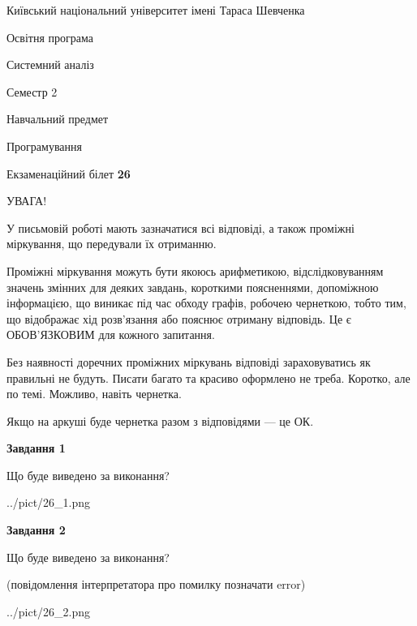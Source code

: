 \documentclass[12pt, ukrainian]{article}
\begin{document}
{{\begin {small}\par
{ \center  Київський національний університет імені Тараса Шевченка \par}
{\parbox {5 cm}{Освітня програма \hfill}{\parbox {7 cm}{Системний аналіз \hfill}}\parbox {6 cm}{\hfill Семестр 2}}\par
{\parbox {5 cm} {Навчальний предмет \hfill}\parbox {7 cm}{Програмування \hfill}\parbox {6cm}{\hfill}\par}\vspace{-7pt} \end{small}}{\center Екзаменаційний білет \No \textbf
{ 26 }\par}}
{
\begin {large}
УВАГА!

У письмовій роботі мають зазначатися всі відповіді, а також проміжні міркування, що передували їх отриманню.

Проміжні міркування можуть бути якоюсь арифметикою, відслідковуванням зна\-чень змінних для деяких завдань,
короткими поясненнями, допоміжною інформацією, що виникає під час обходу графів, робочею чернеткою,
тобто тим, що відображає хід розв’язання або пояснює отриману відповідь.
Це є ОБОВ’ЯЗКОВИМ для кожного запитання.

Без наявності доречних проміжних міркувань відповіді зараховуватись як правиль\-ні не будуть.
Писати багато та красиво оформлено не треба. Коротко, але по темі. Можли\-во, навіть чернетка.

Якщо на аркуші буде чернетка разом з відповідями --- це ОК.

\newpage

{\begin {center}\textbf{Завдання 1}\end {center}}\par
Що буде виведено за виконання?\par
\begin{center}
	{../pict/26_1.png}
\end{center}
\newpage

{\begin {center}\textbf{Завдання 2}\end {center}}\par
Що буде виведено за виконання?\par
 (повідомлення інтерпретатора про помилку позначати error)\par
\begin{center}
	{../pict/26_2.png}
\end{center}
\newpage


\end{large}}
\end{document}
